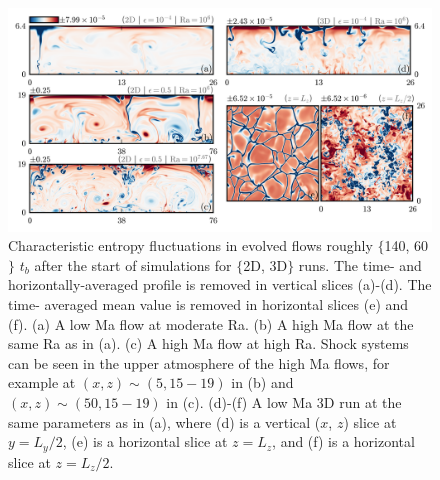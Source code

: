 \documentclass[aps, pre, onecolumn, nofootinbib, notitlepage, groupedaddress, amsfonts, amssymb, amsmath, longbibliography]{revtex4-1}
\begin{document}
\begin{figure}[t!]
\includegraphics[width=\textwidth]{./figs/snapshots_fig.png}
\caption{Characteristic entropy fluctuations in evolved flows roughly
$\{$140, 60$\}$ $t_b$ after the start of simulations for $\{$2D, 3D$\}$ runs. 
The time- and horizontally-averaged profile is removed in vertical slices (a)-(d). 
The time- averaged mean value is removed in horizontal slices (e) and (f).
(a) A low Ma flow at moderate Ra. (b) A high Ma flow at the same Ra as in (a).
(c) A high Ma flow at high Ra. 
Shock systems can be seen in the upper atmosphere of the high Ma flows,
for example at $(x, z) \sim (5, 15-19)$ in (b) and $(x, z) \sim 
(50, 15-19)$ in (c).
(d)-(f) A low Ma 3D run at the same parameters as in (a),
where (d) is a vertical ($x$, $z$) slice at $y = L_y/2$, (e) is a horizontal slice
at $z = L_z$, and (f) is a horizontal slice at $z = L_z/2$.
\label{fig:entropy_snapshots} }
\end{figure}
\end{document}
